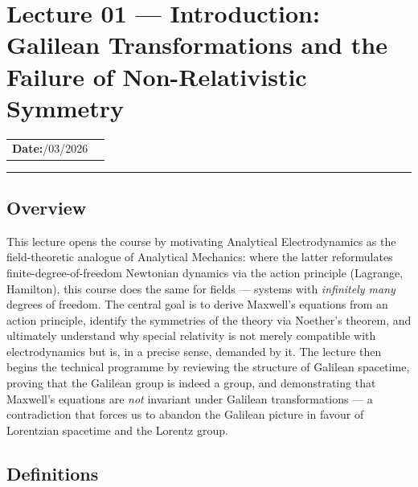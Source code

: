 
\section{Lecture 01 — Introduction: Galilean Transformations and the
  Failure of Non-Relativistic Symmetry}\label{sec:lec01}

\begin{center}
\begin{tabular}{ll}
  \textbf{Date:}\quad 22/03/2026   & \\
\end{tabular}
\end{center}
\hrule\vspace{1.5em}

\subsection*{Overview}

This lecture opens the course by motivating Analytical Electrodynamics
as the field-theoretic analogue of Analytical Mechanics: where the
latter reformulates finite-degree-of-freedom Newtonian dynamics via
the action principle (Lagrange, Hamilton), this course does the same
for fields — systems with \emph{infinitely many} degrees of freedom.
The central goal is to derive Maxwell's equations from an action
principle, identify the symmetries of the theory via Noether's theorem,
and ultimately understand why special relativity is not merely
compatible with electrodynamics but is, in a precise sense, demanded
by it.  The lecture then begins the technical programme by reviewing
the structure of Galilean spacetime, proving that the Galilean group is
indeed a group, and demonstrating that Maxwell's equations are
\emph{not} invariant under Galilean transformations — a contradiction
that forces us to abandon the Galilean picture in favour of Lorentzian
spacetime and the Lorentz group.

\subsection*{Definitions}

